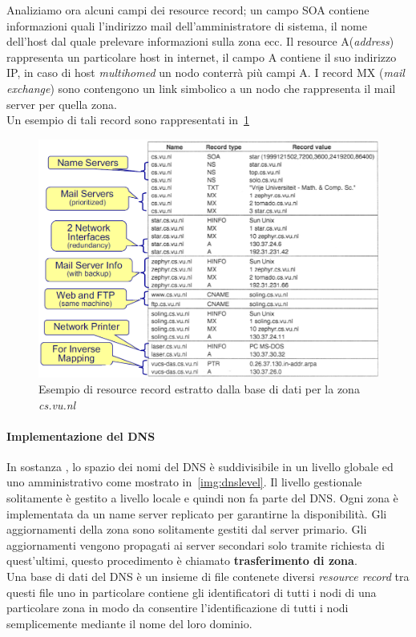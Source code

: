 Analiziamo ora alcuni campi dei resource record; un campo SOA contiene informazioni quali l'indirizzo mail dell'amministratore di sistema, il nome dell'host dal quale prelevare informazioni sulla zona ecc.
Il resource A(\emph{address}) rappresenta un particolare host in internet, il campo A contiene il suo indirizzo IP, in caso di host \emph{multihomed} un nodo conterrà più campi A.
I record MX (\emph{mail exchange}) sono contengono un link simbolico a un nodo che rappresenta il mail server per quella zona.\\
Un esempio di tali record sono rappresentati in \figurename\,\ref{img:resourcer}
\begin{figure}[htb]
\centering
\includegraphics[scale=0.5]{img/resourcer.png}
\caption{Esempio di resource record estratto dalla base di dati per la zona \emph{cs.vu.nl}}\label{img:resourcer}
\end{figure}
\paragraph{Implementazione del DNS}
In sostanza , lo spazio dei nomi del DNS è suddivisibile in un livello globale ed uno amministrativo come mostrato in \figurename\,\ref{img:dnslevel}. Il livello gestionale solitamente è gestito a livello locale e quindi non fa parte del DNS. Ogni zona è implementata da un name server replicato per garantirne la disponibilità. Gli aggiornamenti della zona sono solitamente gestiti dal server primario. Gli aggiornamenti vengono propagati ai server secondari solo tramite richiesta di quest'ultimi, questo procedimento è chiamato \textbf{trasferimento di zona}.\\
Una base di dati del DNS è un insieme di file contenete diversi \emph{resource record} tra questi file uno in particolare contiene gli identificatori di tutti i nodi di una particolare zona in modo da consentire l'identificazione di tutti i nodi semplicemente mediante il nome del loro dominio.
